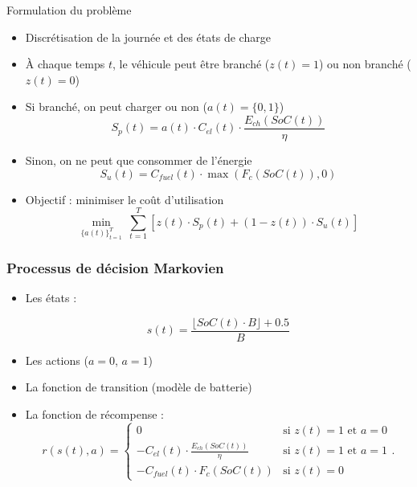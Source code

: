\documentclass[french]{beamer}
\begin{document}
{\begin{frame}{Formulation du problème}
\begin{itemize}
	\item Discrétisation de la journée et des états de charge
	\item À chaque temps $t$, le véhicule peut être branché ($z(t)=1$) ou non branché ($z(t)=0$)
	\item Si branché, on peut charger ou non ($a(t) = \{0, 1\}$)
\begin{equation}\label{eq:costp1}
S_p(t) = a(t) \cdot C_{el}(t) \cdot \frac{E_{ch}(SoC(t))}{\eta}
\end{equation}
	\item Sinon, on ne peut que consommer de l'énergie
\begin{equation}\label{eq:costp2}
S_u(t) = C_{fuel}(t) \cdot \max(F_{c}(SoC(t)),0)
\end{equation}
	\item Objectif : minimiser le coût d'utilisation
\begin{equation}
\min_{\{a(t)\}_{t=1}^T}~\sum_{t=1}^{T} \left[z(t) \cdot S_p(t) + (1-z(t)) \cdot S_u(t)\right]
\label{eq:cost}
\end{equation}
\end{itemize}

\end{frame}


\begin{frame}
\frametitle{Processus de décision Markovien}
\begin{center}
\begin{itemize}
\item Les états :
 
\begin{equation}
s(t) = \frac{\lfloor \mathit{SoC}(t) \cdot B \rfloor + 0.5}{B} 
\label{eq:state}
\end{equation}
\item Les actions ($a=0$, $a=1$)
\item La fonction de transition (modèle de batterie)
\item La fonction de récompense :
\begin{equation}
r(s(t),a) =
\begin{cases}
0 & \text{si $z(t)=1$ et $a=0$}\\
-C_{el}(t) \cdot \frac{E_{ch}(SoC(t))}{\eta} & \text{si $z(t)=1$ et $a=1$}\\
- C_{fuel}(t) \cdot F_{c}(SoC(t)) & \text{si $z(t)=0$}   
\end{cases}.\label{eq:reward}
\end{equation}
\end{itemize}
\end{center}
\end{frame}



}
\end{document}
